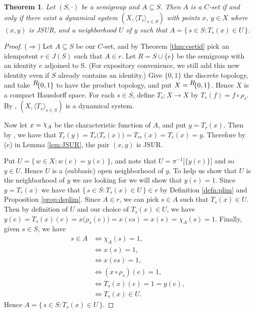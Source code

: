 \documentclass[12pt]{article}
\theoremstyle{plain}
\newtheorem{thm}{Theorem}[section]
\theoremstyle{definition}
\newcommand{\la}{\langle}
\newcommand{\ra}{\rangle}
\newcommand{\ds}{(X, \la T_s \ra_{s\in S})}
\newcommand{\setfunc}[2]{\hbox{${}^{\hbox{$#1$}}\hskip -2 pt #2$}}
\newcommand{\cchi}{\raise 2 pt \hbox{$\chi$}}
\begin{document}
  \begin{thm}
    \label{thm:dyncsets}
    Let $(S,\cdot)$ be a semigroup and $A \subseteq S$. 
    Then $A$ is a $C$-set if and only if there exist a dynamical
    system $\ds$ with points $x$, $y \in X$ where $(x,y)$ is JSUR, and
    a neighborhood $U$ of $y$ such that $A = \{\, s \in S : T_s(x) \in
    U \,\}$.
  \end{thm}
  \begin{proof}
    ($\Rightarrow$) Let $A \subseteq S$ be our $C$-set, and by
    Theorem \ref{thm:csetid} pick an idempotent $r \in J(S)$ such that
    $A \in r$. 
    Let $R = S \cup \{e\}$ be the semigroup with an identity $e$
    adjoined to S. 
    (For expository convenience, we still add this new identity even
    if $S$ already contains an identity.)
    Give $\{0,1\}$ the discrete topology, and take
    $\setfunc{R}{\{0,1\}}$ to have
    the product topology, and put $X = \setfunc{R}{\{0,1\}}$.
    Hence $X$ is a compact Hausdorff space.
    For each $s \in S$, define $T_s : X \to X$ by $T_s(f) = f \circ
    \rho_s$. 
    By \cite[Theorem 19.14]{Hindman:1998fk}, $\ds$ is a dynamical
    system. 
    
    Now let $x = \cchi_A$ be the characteristic function of $A$, and
    put $y = T_r(x)$.
    Then by \cite[Remark 19.13]{Hindman:1998fk}, we have that $T_r(y)
    = T_r\bigl(T_r(x)\bigr) = T_{rr}(x) = T_r(x) = y$.
    Therefore by (c) in Lemma \ref{lem:JSUR}, the pair $(x, y)$ is JSUR.

    Put $U = \{\, w \in X : w(e) = y(e) \,\}$, and note that $U =
    \pi^{-1}\bigl[\{y(e)\}\bigr]$ and so $y \in U$. 
    Hence $U$ is a (subbasic) open neighborhood of $y$.
    To help us show that $U$ is the neighborhood of $y$ we are looking
    for we will show that $y(e) = 1$.
    Since $y = T_r(x)$ we have that $\{\, s \in S : T_s(x) \in U \,\}
    \in r$ by Definition \ref{defn:plim} and Proposition \ref{prop:dsplim}.
    Since $A \in r$, we can pick $s \in A$ such that $T_s(x) \in U$. 
    Then by definition of $U$ and our choice of $T_s(x) \in U$, we
    have $y(e) = T_s(x)(e) = x\bigl(\rho_s(e)\bigr) = x(es) = x(s) =
    \chi_{A}(s) = 1$. 
    Finally, given $s \in S$, we have
      \begin{align*}
        s \in A &\iff \chi_{A}(s) = 1, \\
                &\iff x(s) = 1, \\
                &\iff x(es) = 1, \\
                &\iff (x \circ \rho_s)(e) = 1, \\
                &\iff T_s(x)(e) = 1 = y(e), \\
                &\iff T_s(x) \in U.
      \end{align*}
   Hence $A = \{\, s \in S : T_s(x) \in U \,\}$. 
   

\end{proof}
\end{document}
